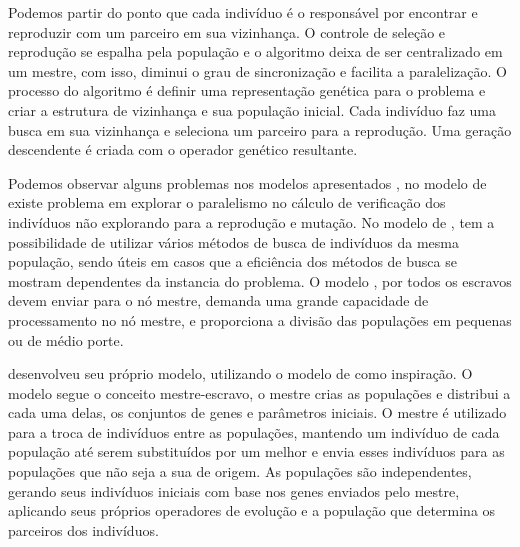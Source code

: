 Podemos partir do ponto que cada indivíduo é o responsável por encontrar e reproduzir com um parceiro em sua vizinhança. O controle de seleção e reprodução se espalha pela população e o algoritmo deixa de ser centralizado em um mestre, com isso, diminui o grau de sincronização e facilita a paralelização. O processo do algoritmo é definir uma representação genética para o problema e criar a estrutura de vizinhança e sua população inicial. Cada indivíduo faz uma busca em sua vizinhança e seleciona um parceiro para a reprodução. Uma geração descendente é criada com o operador genético resultante. \cite{Heinz}

Podemos observar alguns problemas nos modelos apresentados \cite{Vilson}, no modelo de \cite{Jason} existe problema em explorar o paralelismo no cálculo de verificação dos indivíduos não explorando para a reprodução e mutação. No modelo de \cite{Heinz}, tem a possibilidade de utilizar vários métodos de busca de indivíduos da mesma população, sendo úteis em casos que a eficiência dos métodos de busca se mostram dependentes da instancia do problema. O modelo \cite{Alaoui}, por todos os escravos devem enviar para o nó mestre, demanda uma grande capacidade de processamento no nó mestre, e proporciona a divisão das populações em pequenas ou de médio porte.

 \cite{Vilson} desenvolveu seu próprio modelo, utilizando o modelo de \cite{Alaoui} como inspiração. O modelo segue o conceito mestre-escravo, o mestre crias as populações e distribui a cada uma delas, os conjuntos de genes e parâmetros iniciais. O mestre é utilizado para a troca de indivíduos entre as populações, mantendo um indivíduo de cada população até serem substituídos por um melhor e envia esses indivíduos para as populações que não seja a sua de origem. As populações são independentes, gerando seus indivíduos iniciais com base nos genes enviados pelo mestre, aplicando seus próprios operadores de evolução e a população que determina os parceiros dos indivíduos.